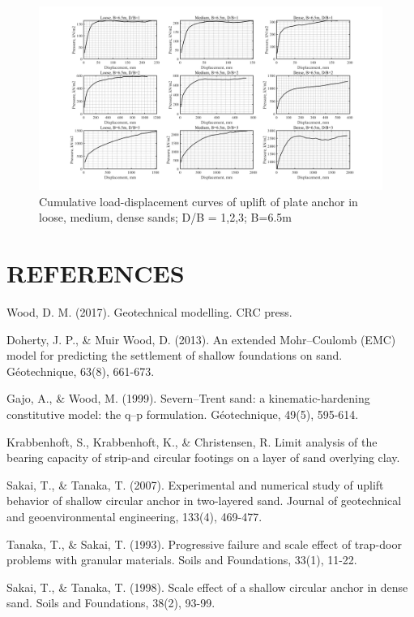\documentclass[a4paper, nobind]{templates/ociamthesis}
\begin{document}
\begin{landscape}
\begin{figure}[H]
\includegraphics[width=1\linewidth]{myfigureeeeee/CodeG} \caption{Cumulative load-displacement curves of uplift of plate anchor in loose, medium, dense sands; D/B = 1,2,3; B=6.5m}\label{fig:unnamed-chunk-58}
\end{figure}

\end{landscape}

\hypertarget{references}{%
\chapter{REFERENCES}\label{references}}

Wood, D. M. (2017). Geotechnical modelling. CRC press.

Doherty, J. P., \& Muir Wood, D. (2013). An extended Mohr--Coulomb (EMC) model for predicting the settlement of shallow foundations on sand. Géotechnique, 63(8), 661-673.

Gajo, A., \& Wood, M. (1999). Severn--Trent sand: a kinematic-hardening constitutive model: the q--p formulation. Géotechnique, 49(5), 595-614.

Krabbenhoft, S., Krabbenhoft, K., \& Christensen, R. Limit analysis of the bearing capacity of strip-and circular footings on a layer of sand overlying clay.

Sakai, T., \& Tanaka, T. (2007). Experimental and numerical study of uplift behavior of shallow circular anchor in two-layered sand. Journal of geotechnical and geoenvironmental engineering, 133(4), 469-477.

Tanaka, T., \& Sakai, T. (1993). Progressive failure and scale effect of trap-door problems with granular materials. Soils and Foundations, 33(1), 11-22.

Sakai, T., \& Tanaka, T. (1998). Scale effect of a shallow circular anchor in dense sand. Soils and Foundations, 38(2), 93-99.
\end{document}
